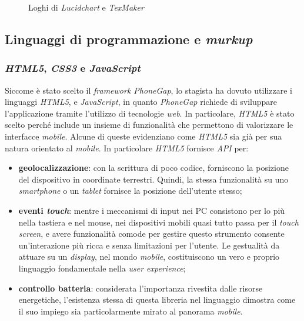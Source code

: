 \begin{figure}[!h] 
    \centering 
    \caption{Loghi di \textit{Lucidchart} e \textit{TexMaker}}
\end{figure}

\subsection{Linguaggi di programmazione e \textit{murkup}}

\subsubsection{\textit{HTML5}, \textit{CSS3} e \textit{JavaScript}}

Siccome è stato scelto il \textit{framework PhoneGap}, lo stagista ha dovuto utilizzare i linguaggi \textit{HTML5},  e \textit{JavaScript}, in quanto \textit{PhoneGap} richiede di sviluppare l'applicazione tramite l'utilizzo di tecnologie \textit{web}. In particolare, \textit{HTML5} è stato scelto perché include un insieme di funzionalità che permettono di valorizzare le interfacce \textit{mobile}. Alcune di queste evidenziano come \textit{HTML5} sia già per sua natura orientato al \textit{mobile}. In particolare \textit{HTML5} fornisce \textit{API} per:
\begin{itemize}
	\item \textbf{geolocalizzazione}: con la scrittura di poco codice, forniscono la posizione del dispositivo in coordinate terrestri. Quindi, la stessa funzionalità su uno \textit{smartphone} o un \textit{tablet} fornisce la posizione dell'utente stesso;
	\item \textbf{eventi \textit{touch}}: mentre i meccanismi di input nei PC consistono per lo più nella tastiera e nel mouse, nei dispositivi mobili quasi tutto passa per il \textit{touch screen}, e avere funzionalità comode per gestire questo strumento consente un'interazione più ricca e senza limitazioni per l'utente. Le gestualità da attuare su un \textit{display}, nel mondo \textit{mobile}, costituiscono un vero e proprio linguaggio fondamentale nella \textit{user experience};
	\item \textbf{controllo batteria}: considerata l'importanza rivestita dalle risorse energetiche, l'esistenza stessa di questa libreria nel linguaggio dimostra come il suo impiego sia particolarmente mirato al panorama \textit{mobile}.
\end{itemize}

